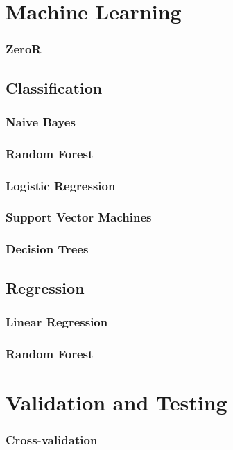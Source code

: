 \section{Machine Learning}


\subsubsection{ZeroR}


\subsection{Classification}


\subsubsection{Naive Bayes}


\subsubsection{Random Forest}


\subsubsection{Logistic Regression}


\subsubsection{Support Vector Machines}


\subsubsection{Decision Trees}


\subsection{Regression}


\subsubsection{Linear Regression}


\subsubsection{Random Forest}


\section{Validation and Testing}


\subsubsection{Cross-validation}

